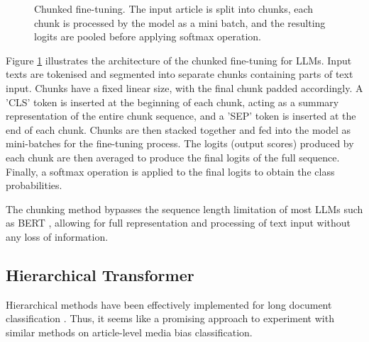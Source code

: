 \begin{figure}[htbp]
    \caption{Chunked fine-tuning. The input article is split into chunks, each chunk is processed by the model as a mini batch, and the resulting logits are pooled before applying softmax operation.}
    \label{fig:chunk_bert_finetuning}
\end{figure}

Figure \ref{fig:chunk_bert_finetuning} illustrates the architecture of the chunked fine-tuning for LLMs. Input texts are tokenised and segmented into separate chunks containing parts of text input. Chunks have a fixed linear size, with the final chunk padded accordingly. A 'CLS' token is inserted at the beginning of each chunk, acting as a summary representation of the entire chunk sequence, and a 'SEP' token is inserted at the end of each chunk. Chunks are then stacked together and fed into the model as mini-batches for the fine-tuning process. The logits (output scores) produced by each chunk are then averaged to produce the final logits of the full sequence. Finally, a softmax operation is applied to the final logits to obtain the class probabilities.

The chunking method bypasses the sequence length limitation of most LLMs such as BERT \cite{devlin-2019-bert}, allowing for full representation and processing of text input without any loss of information.


\subsection{Hierarchical Transformer}

Hierarchical methods have been effectively implemented for long document classification \cite{wu-2021-hi-transformer,kulkarni-2018-multi-view,su-2021-classifying,khandve-2022-hierarchical-longdoc,pappagari-2019-hierarchical,yang-2016-han}. Thus, it seems like a promising approach to experiment with similar methods on article-level media bias classification.

